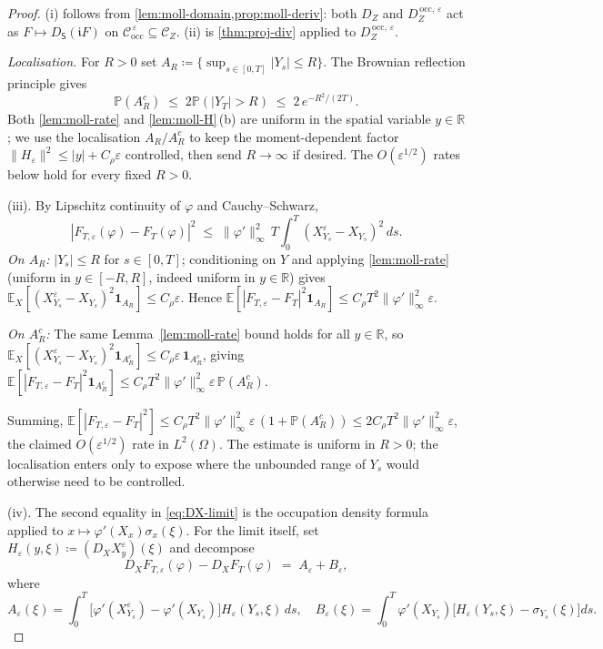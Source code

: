 \documentclass[11pt,reqno]{amsart}
\theoremstyle{plain}
\theoremstyle{definition}
\theoremstyle{remark}
\newcommand{\R}{\mathbb{R}}
\newcommand{\E}{\mathbb{E}}
\newcommand{\Prob}{\mathbb{P}}
\newcommand{\Source}{\mathsf{S}}
\renewcommand{\iota}{\mathfrak{i}}
\newcommand{\IBM}{Z}
\begin{document}
\begin{proof}
(i) follows from \cref{lem:moll-domain,prop:moll-deriv}: both $D_\IBM$
and $D_\IBM^{\,\mathrm{occ},\,\varepsilon}$ act as
$F\mapsto D_\Source(\iota F)$ on
$\mathcal C_{\mathrm{occ}}^{\,\varepsilon}\subseteq\mathcal C_\IBM$.
(ii) is \cref{thm:proj-div} applied to
$D_\IBM^{\,\mathrm{occ},\,\varepsilon}$.

\emph{Localisation.} For $R>0$ set
$A_R\coloneqq\{\sup_{s\in[0,T]}|Y_s|\le R\}$. The Brownian reflection
principle gives
\begin{equation}\label{eq:bm-max}
  \Prob(A_R^{c})\;\le\;2\Prob(|Y_T|>R)\;\le\;2\,e^{-R^{2}/(2T)}.
\end{equation}
Both \cref{lem:moll-rate} and \cref{lem:moll-H}\,(b) are uniform in the
spatial variable $y\in\R$; we use the localisation $A_R/A_R^{c}$ to
keep the moment-dependent factor $\|H_\varepsilon\|^{2}\le|y|+C_\rho\varepsilon$
controlled, then send $R\to\infty$ if desired. The
$O(\varepsilon^{1/2})$ rates below hold for every fixed $R>0$.

(iii). By Lipschitz continuity of $\varphi$ and Cauchy--Schwarz,
\[
  |F_{T,\varepsilon}(\varphi)-F_T(\varphi)|^{2}
  \;\le\;\|\varphi'\|_\infty^{2}\,T
   \int_0^T(X^\varepsilon_{Y_s}-X_{Y_s})^{2}\,ds.
\]
\emph{On $A_R$:} $|Y_s|\le R$ for $s\in[0,T]$; conditioning on $Y$ and
applying \cref{lem:moll-rate} (uniform in $y\in[-R,R]$, indeed uniform
in $y\in\R$) gives
$\E_X[(X^\varepsilon_{Y_s}-X_{Y_s})^{2}\mathbf 1_{A_R}]\le C_\rho\varepsilon$.
Hence
$\E[|F_{T,\varepsilon}-F_T|^{2}\mathbf 1_{A_R}]\le C_\rho T^{2}\|\varphi'\|_\infty^{2}\varepsilon$.

\emph{On $A_R^{c}$:} The same Lemma~\ref{lem:moll-rate} bound holds for
all $y\in\R$, so
$\E_X[(X^\varepsilon_{Y_s}-X_{Y_s})^{2}\mathbf 1_{A_R^{c}}]\le C_\rho\varepsilon\,
\mathbf 1_{A_R^{c}}$, giving
$\E[|F_{T,\varepsilon}-F_T|^{2}\mathbf 1_{A_R^{c}}]\le
C_\rho T^{2}\|\varphi'\|_\infty^{2}\varepsilon\,\Prob(A_R^{c})$.

Summing, $\E[|F_{T,\varepsilon}-F_T|^{2}]\le
C_\rho T^{2}\|\varphi'\|_\infty^{2}\varepsilon\,(1+\Prob(A_R^{c}))\le
2C_\rho T^{2}\|\varphi'\|_\infty^{2}\varepsilon$, the claimed
$O(\varepsilon^{1/2})$ rate in $L^{2}(\Omega)$. The estimate is uniform
in $R>0$; the localisation enters only to expose where the
unbounded range of $Y_s$ would otherwise need to be controlled.

(iv). The second equality in \eqref{eq:DX-limit} is the occupation
density formula applied to $x\mapsto\varphi'(X_x)\sigma_x(\xi)$. For
the limit itself, set $H_\varepsilon(y,\xi)\coloneqq(D_XX^\varepsilon_y)(\xi)$
and decompose
\[
  D_X F_{T,\varepsilon}(\varphi)-D_X F_T(\varphi)\;=\;A_\varepsilon+B_\varepsilon,
\]
where
\[
  A_\varepsilon(\xi)
  =\!\int_0^T\!\bigl[\varphi'(X^\varepsilon_{Y_s})-\varphi'(X_{Y_s})\bigr]
   H_\varepsilon(Y_s,\xi)\,ds,
  \quad
  B_\varepsilon(\xi)
  =\!\int_0^T\!\varphi'(X_{Y_s})\bigl[H_\varepsilon(Y_s,\xi)-\sigma_{Y_s}(\xi)\bigr]ds.
\]


\end{proof}
\end{document}
